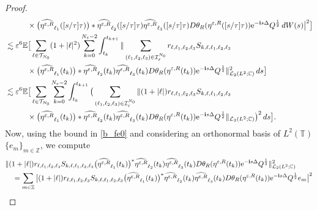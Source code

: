 \documentclass[a4paper]{amsart}
\begin{document}
\begin{proof}
\begin{align*}
       &\hspace{1cm}\times \big(\widehat{\eta^{\varepsilon,R}}_{\ell_1}([s/\tau]\tau)\big)*\widehat{\eta^{\varepsilon,R}}_{\ell_2}([s/\tau]\tau)\widehat{\eta^{\varepsilon,R}}_{\ell_3}([s/\tau]\tau) D\theta_R(\eta^{\varepsilon,R}([s/\tau]\tau)){{\rm e}}^{-{\bf i}s\Delta}Q^{\frac{1}{2}}\,dW(s)\big|^2\big]\\
       &\lesssim  \varepsilon^6 \mathbb{E}\big[\sum_{\ell\in\mathcal{T}_{N_0}}(1+|\ell|^2) \sum_{k=0}^{N_\varepsilon-2}\int_{t_k}^{t_{k+1}}
       \|\sum_{(\ell_1,\ell_2,\ell_3)\in\mathcal{I}_{\ell}^{N_0}} r_{\ell,\ell_1,\ell_2,\ell_3}S_{k,\ell,\ell_1,\ell_2,\ell_3}\\
       &\hspace{1cm}\times \big(\widehat{\eta^{\varepsilon,R}}_{\ell_1}(t_k)\big)*\widehat{\eta^{\varepsilon,R}}_{\ell_2}(t_k)\widehat{\eta^{\varepsilon,R}}_{\ell_3}(t_k) D\theta_R(\eta^{\varepsilon,R}(t_k)){{\rm e}}^{-{\bf i}s\Delta}Q^{\frac{1}{2}} \|^2_{\mathcal{L}_2(L^2;\mathbb{C})}\,ds\big]\\
       &\lesssim  \varepsilon^6 \mathbb{E}\big[\sum_{\ell\in\mathcal{T}_{N_0}} \sum_{k=0}^{N_\varepsilon-2}\int_{t_k}^{t_{k+1}}
       \big(\sum_{(\ell_1,\ell_2,\ell_3)\in\mathcal{I}_{\ell}^{N_0}}\| (1+|\ell|) r_{\ell,\ell_1,\ell_2,\ell_3}S_{k,\ell,\ell_1,\ell_2,\ell_3}\\
       &\hspace{1cm}\times \big(\widehat{\eta^{\varepsilon,R}}_{\ell_1}(t_k)\big)*\widehat{\eta^{\varepsilon,R}}_{\ell_2}(t_k)\widehat{\eta^{\varepsilon,R}}_{\ell_3}(t_k) D\theta_R(\eta^{\varepsilon,R}(t_k)){{\rm e}}^{-{\bf i}s\Delta}Q^{\frac{1}{2}}\|_{\mathcal{L}_2(L^2;\mathbb{C})} \big)^2\,ds\big].
   \end{align*}
   Now, using the bound in \eqref{b_fe0} and considering an orthonormal basis of $L^2(\mathbb{T})$ $\{e_m\}_{m\in\mathbb{Z}}$, we compute
   \begin{align*}
       &\| (1+|\ell|) r_{\ell,\ell_1,\ell_2,\ell_3}S_{k,\ell,\ell_1,\ell_2,\ell_3}
        \big(\widehat{\eta^{\varepsilon,R}}_{\ell_1}(t_k)\big)^*\widehat{\eta^{\varepsilon,R}}_{\ell_2}(t_k)\widehat{\eta^{\varepsilon,R}}_{\ell_3}(t_k) D\theta_R(\eta^{\varepsilon,R}(t_k)){{\rm e}}^{-{\bf i}s\Delta}Q^{\frac{1}{2}}\|_{\mathcal{L}_2(L^2;\mathbb{C})}^2\\
        &\quad = \sum_{m\in\mathbb{Z}} \big|(1+|\ell|) r_{\ell,\ell_1,\ell_2,\ell_3}S_{k,\ell,\ell_1,\ell_2,\ell_3}
       \big(\widehat{\eta^{\varepsilon,R}}_{\ell_1}(t_k)\big)^*\widehat{\eta^{\varepsilon,R}}_{\ell_2}(t_k)\widehat{\eta^{\varepsilon,R}}_{\ell_3}(t_k) D\theta_R(\eta^{\varepsilon,R}(t_k)){{\rm e}}^{-{\bf i}s\Delta}Q^{\frac{1}{2}}e_m\big|^2\\

\end{align*}
\end{proof}
\end{document}
